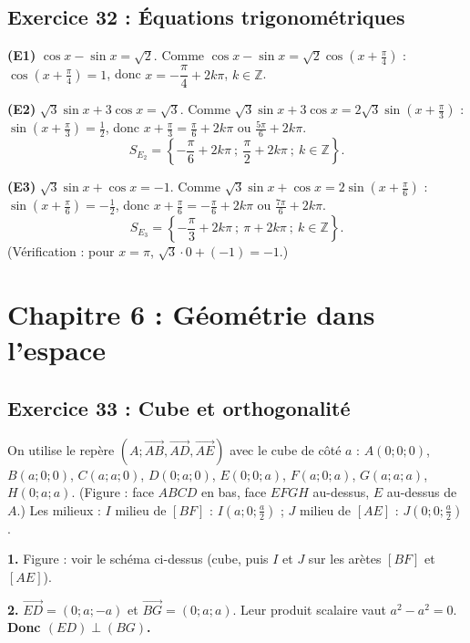 \documentclass[11pt,a4paper]{article}
\newcommand{\vect}[1]{\overrightarrow{#1}}
\begin{document}
\subsection{Exercice 32 : \'Equations trigonom\'etriques}

\textbf{(E1)} $\cos x-\sin x=\sqrt2$. Comme $\cos x-\sin x=\sqrt2\cos\left(x+\frac{\pi}{4}\right)$ : $\cos\left(x+\frac{\pi}{4}\right)=1$,
donc $x=-\dfrac{\pi}{4}+2k\pi$, $k\in\mathbb Z$.

\textbf{(E2)} $\sqrt3\sin x+3\cos x=\sqrt3$. Comme $\sqrt3\sin x+3\cos x=2\sqrt3\sin\left(x+\frac{\pi}{3}\right)$ :
$\sin\left(x+\frac{\pi}{3}\right)=\frac12$, donc $x+\frac{\pi}{3}=\frac{\pi}{6}+2k\pi$ ou $\frac{5\pi}{6}+2k\pi$.
\[
S_{E_2}=\left\{-\frac{\pi}{6}+2k\pi\ ;\ \frac{\pi}{2}+2k\pi\ ;\ k\in\mathbb Z\right\}.
\]

\textbf{(E3)} $\sqrt3\sin x+\cos x=-1$. Comme $\sqrt3\sin x+\cos x=2\sin\left(x+\frac{\pi}{6}\right)$ :
$\sin\left(x+\frac{\pi}{6}\right)=-\frac12$, donc $x+\frac{\pi}{6}=-\frac{\pi}{6}+2k\pi$ ou $\frac{7\pi}{6}+2k\pi$.
\[
S_{E_3}=\left\{-\frac{\pi}{3}+2k\pi\ ;\ \pi+2k\pi\ ;\ k\in\mathbb Z\right\}.
\]
(V\'erification : pour $x=\pi$, $\sqrt3\cdot0+(-1)=-1$.)

\section{Chapitre 6 : G\'eom\'etrie dans l'espace}

\subsection{Exercice 33 : Cube et orthogonalit\'e}

On utilise le rep\`ere $\left(A;\vect{AB},\vect{AD},\vect{AE}\right)$ avec le cube de c\^ot\'e $a$ :
$A(0;0;0)$, $B(a;0;0)$, $C(a;a;0)$, $D(0;a;0)$, $E(0;0;a)$, $F(a;0;a)$, $G(a;a;a)$, $H(0;a;a)$.
(Figure : face $ABCD$ en bas, face $EFGH$ au-dessus, $E$ au-dessus de $A$.)
Les milieux : $I$ milieu de $[BF]$ : $I\left(a;0;\frac a2\right)$ ; $J$ milieu de $[AE]$ : $J\left(0;0;\frac a2\right)$.

\textbf{1.} Figure : voir le sch\'ema ci-dessus (cube, puis $I$ et $J$ sur les ar\`etes $[BF]$ et $[AE]$).

\textbf{2.} $\vect{ED}=(0;a;-a)$ et $\vect{BG}=(0;a;a)$. Leur produit scalaire vaut $a^2-a^2=0$.
\textbf{Donc $(ED)\perp(BG)$.}
\end{document}
